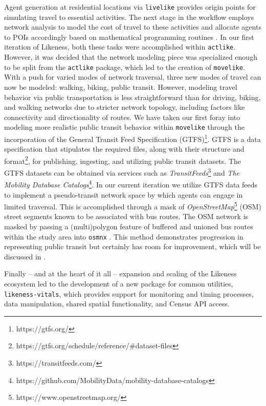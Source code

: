 

Agent generation at residential locations via \texttt{livelike} provides origin points for simulating travel to essential activities. 
The next stage in the workflow employs network analysis to model the cost of travel to these activities \cite{OpenStreetMap, osmnx_CEUS_2017, foti_generalized_2012} and allocate agents to POIs accordingly based on mathematical programming routines \cite{mitchell_pulp_2011, santos_mixed_2020, lougee_coin_2003, forrest_coinorcbc_2023}. In our first iteration of Likeness, both these tasks were accomplished within \texttt{actlike}. However, it was decided that the network modeling piece was specialized enough to be split from the \texttt{actlike} package, which led to the creation of \texttt{movelike}. With a push for varied modes of network traversal, three new modes of travel can now be modeled: walking, biking, public transit. However, modeling travel behavior via public transportation is less straightforward than for driving, biking, and walking networks due to stricter network topology, including factors like connectivity and directionality of routes. We have taken our first foray into modeling more realistic public transit behavior within \texttt{movelike} through the incorporation of the General Transit Feed Specification (GTFS)\footnote{https://gtfs.org/}. GTFS is a data specification that stipulates the required files, along with their structure and format\footnote{https://gtfs.org/schedule/reference/\#dataset-files}, for publishing, ingesting, and utilizing public transit datasets. The GTFS datasets can be obtained via services such as \textit{TransitFeeds}\footnote{https://transitfeeds.com/} and \textit{The Mobility Database Catalogs}\footnote{https://github.com/MobilityData/mobility-database-catalogs}. In our current iteration we utilize GTFS data feeds to implement a pseudo-transit network space by which agents can engage in limited traversal. This is accomplished through a mask of \textit{OpenStreetMap}\footnote{https://www.openstreetmap.org/} (OSM) street segments known to be associated with bus routes. The OSM network is masked by passing a (multi)polygon feature of buffered and unioned bus routes within the study area into \texttt{osmnx} \cite{osmnx_CEUS_2017}. This method demonstrates progression in representing public transit but certainly has room for improvement, which will be discussed in .

Finally -- and at the heart of it all -- expansion and scaling of the Likeness ecosystem led to the development of a new package for common utilities, \texttt{likeness-vitals}, which provides support for monitoring and timing processes, data manipulation, shared spatial functionality, and Census API access.

